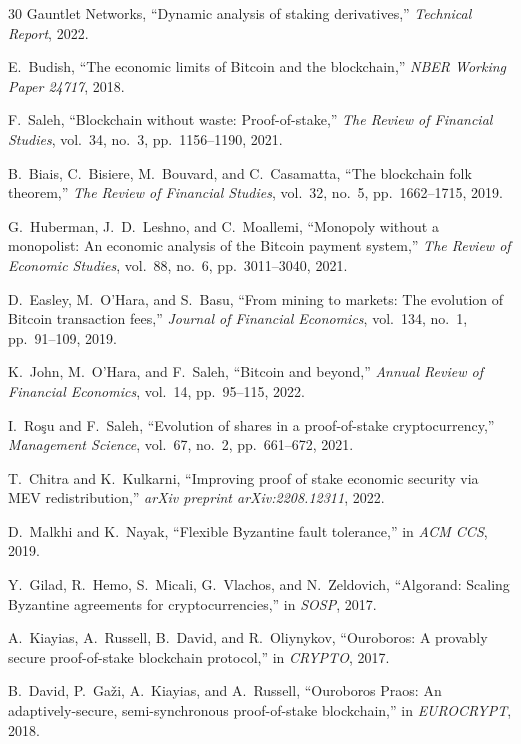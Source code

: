 \begin{thebibliography}{30}
Gauntlet Networks, ``Dynamic analysis of staking derivatives,'' \emph{Technical Report}, 2022.

E.~Budish, ``The economic limits of Bitcoin and the blockchain,'' \emph{NBER Working Paper 24717}, 2018.

F.~Saleh, ``Blockchain without waste: Proof-of-stake,'' \emph{The Review of Financial Studies}, vol.~34, no.~3, pp.~1156--1190, 2021.

B.~Biais, C.~Bisiere, M.~Bouvard, and C.~Casamatta, ``The blockchain folk theorem,'' \emph{The Review of Financial Studies}, vol.~32, no.~5, pp.~1662--1715, 2019.

G.~Huberman, J.~D.~Leshno, and C.~Moallemi, ``Monopoly without a monopolist: An economic analysis of the Bitcoin payment system,'' \emph{The Review of Economic Studies}, vol.~88, no.~6, pp.~3011--3040, 2021.

D.~Easley, M.~O'Hara, and S.~Basu, ``From mining to markets: The evolution of Bitcoin transaction fees,'' \emph{Journal of Financial Economics}, vol.~134, no.~1, pp.~91--109, 2019.

K.~John, M.~O'Hara, and F.~Saleh, ``Bitcoin and beyond,'' \emph{Annual Review of Financial Economics}, vol.~14, pp.~95--115, 2022.

I.~Ro\c{s}u and F.~Saleh, ``Evolution of shares in a proof-of-stake cryptocurrency,'' \emph{Management Science}, vol.~67, no.~2, pp.~661--672, 2021.

T.~Chitra and K.~Kulkarni, ``Improving proof of stake economic security via MEV redistribution,'' \emph{arXiv preprint arXiv:2208.12311}, 2022.

D.~Malkhi and K.~Nayak, ``Flexible Byzantine fault tolerance,'' in \emph{ACM CCS}, 2019.

Y.~Gilad, R.~Hemo, S.~Micali, G.~Vlachos, and N.~Zeldovich, ``Algorand: Scaling Byzantine agreements for cryptocurrencies,'' in \emph{SOSP}, 2017.

A.~Kiayias, A.~Russell, B.~David, and R.~Oliynykov, ``Ouroboros: A provably secure proof-of-stake blockchain protocol,'' in \emph{CRYPTO}, 2017.

B.~David, P.~Ga\v{z}i, A.~Kiayias, and A.~Russell, ``Ouroboros Praos: An adaptively-secure, semi-synchronous proof-of-stake blockchain,'' in \emph{EUROCRYPT}, 2018.

\end{thebibliography}

